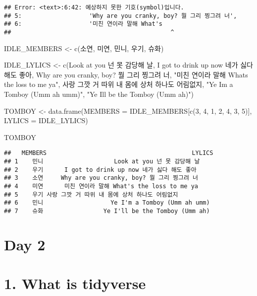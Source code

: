 \documentclass[
  12,
]{article}
\newenvironment{Shaded}{\begin{snugshade}}{\end{snugshade}}
\newcommand{\AttributeTok}[1]{\textcolor[rgb]{0.77,0.63,0.00}{#1}}
\newcommand{\DecValTok}[1]{\textcolor[rgb]{0.00,0.00,0.81}{#1}}
\newcommand{\FunctionTok}[1]{\textcolor[rgb]{0.00,0.00,0.00}{#1}}
\newcommand{\NormalTok}[1]{#1}
\newcommand{\OtherTok}[1]{\textcolor[rgb]{0.56,0.35,0.01}{#1}}
\newcommand{\StringTok}[1]{\textcolor[rgb]{0.31,0.60,0.02}{#1}}
\begin{document}
\begin{verbatim}
## Error: <text>:6:42: 예상하지 못한 기호(symbol)입니다.
## 5:                   'Why are you cranky, boy? 뭘 그리 찡그려 너', 
## 6:                   '미친 연이라 말해 What's
##                                             ^
\end{verbatim}

\begin{Shaded}
\begin{Highlighting}[]
\NormalTok{IDLE\_MEMBERS }\OtherTok{\textless{}{-}} \FunctionTok{c}\NormalTok{(}\StringTok{\textquotesingle{}소연\textquotesingle{}}\NormalTok{, }\StringTok{\textquotesingle{}미연\textquotesingle{}}\NormalTok{, }\StringTok{\textquotesingle{}민니\textquotesingle{}}\NormalTok{, }\StringTok{\textquotesingle{}우기\textquotesingle{}}\NormalTok{, }\StringTok{\textquotesingle{}슈화\textquotesingle{}}\NormalTok{)}

\NormalTok{IDLE\_LYLICS }\OtherTok{\textless{}{-}} \FunctionTok{c}\NormalTok{(}\StringTok{\textquotesingle{}Look at you 넌 못 감당해 날\textquotesingle{}}\NormalTok{, }
                 \StringTok{\textquotesingle{}I got to drink up now 네가 싫다 해도 좋아\textquotesingle{}}\NormalTok{, }
                 \StringTok{\textquotesingle{}Why are you cranky, boy? 뭘 그리 찡그려 너\textquotesingle{}}\NormalTok{, }
                 \StringTok{"미친 연이라 말해 What\textquotesingle{}s the loss to me ya"}\NormalTok{, }
                 \StringTok{\textquotesingle{}사랑 그깟 거 따위 내 몸에 상처 하나도 어림없지\textquotesingle{}}\NormalTok{, }
                 \StringTok{"Ye I\textquotesingle{}m a Tomboy (Umm ah umm)"}\NormalTok{, }
                 \StringTok{"Ye I\textquotesingle{}ll be the Tomboy (Umm ah)"}\NormalTok{)}
                  
\NormalTok{TOMBOY }\OtherTok{\textless{}{-}} \FunctionTok{data.frame}\NormalTok{(}\AttributeTok{MEMBERS =}\NormalTok{ IDLE\_MEMBERS[}\FunctionTok{c}\NormalTok{(}\DecValTok{3}\NormalTok{, }\DecValTok{4}\NormalTok{, }\DecValTok{1}\NormalTok{, }\DecValTok{2}\NormalTok{, }\DecValTok{4}\NormalTok{, }\DecValTok{3}\NormalTok{, }\DecValTok{5}\NormalTok{)], }
                     \AttributeTok{LYLICS =}\NormalTok{ IDLE\_LYLICS)}

\NormalTok{TOMBOY}
\end{Highlighting}
\end{Shaded}

\begin{verbatim}
##   MEMBERS                                         LYLICS
## 1    민니                    Look at you 넌 못 감당해 날
## 2    우기      I got to drink up now 네가 싫다 해도 좋아
## 3    소연     Why are you cranky, boy? 뭘 그리 찡그려 너
## 4    미연      미친 연이라 말해 What's the loss to me ya
## 5    우기 사랑 그깟 거 따위 내 몸에 상처 하나도 어림없지
## 6    민니                   Ye I'm a Tomboy (Umm ah umm)
## 7    슈화                 Ye I'll be the Tomboy (Umm ah)
\end{verbatim}

\hypertarget{day-2}{%
\section{Day 2}\label{day-2}}

\hypertarget{what-is-tidyverse}{%
\section{1. What is tidyverse}\label{what-is-tidyverse}}
\end{document}
